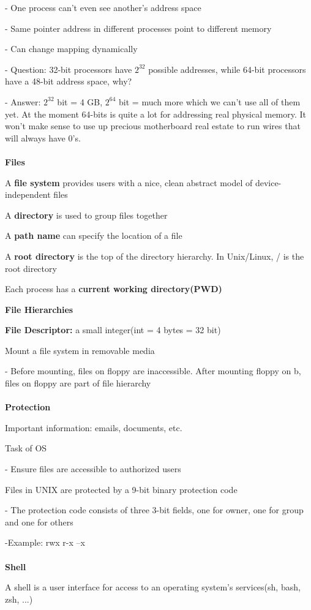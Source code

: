 \documentclass[]{report}
\begin{document}
- One process can't even see another's address space

- Same pointer address in different processes point to different memory

- Can change mapping dynamically

- Question: 32-bit processors have $2^32$ possible addresses, while 64-bit processors have a 48-bit
address space, why?

- Answer: $2^{32}$ bit = 4 GB, $2^64$ bit = much more which we can't use all of them yet. At the moment 64-bits is quite a lot for addressing real physical memory. It won't make sense to use up precious motherboard real estate to run wires that will always have 0's.\\\\
\textbf{Files}

A \textbf{file system} provides users with a nice, clean abstract model of device-independent files

A \textbf{directory} is used to group files together

A \textbf{path name} can specify the location of a file

A \textbf{root directory} is the top of the directory hierarchy. In Unix/Linux, / is the root directory

Each process has a \textbf{current working directory(PWD)}

\textbf{File Hierarchies}

\textbf{File Descriptor: }a small integer(int = 4 bytes = 32 bit)

Mount a file system in removable media

- Before mounting, files on floppy are inaccessible. After mounting floppy on b, files on floppy are part of file hierarchy\\\\
\textbf{Protection}

Important information: emails, documents, etc.

Task of OS

- Ensure files are accessible to authorized users

Files in UNIX are protected by a 9-bit binary protection code

- The protection code consists of three 3-bit fields, one for owner, one for group and one for others

-Example: rwx r-x --x\\\\
\textbf{Shell}

A shell is a user interface for access to an operating system's services(sh, bash, zsh, ...)
\end{document}
